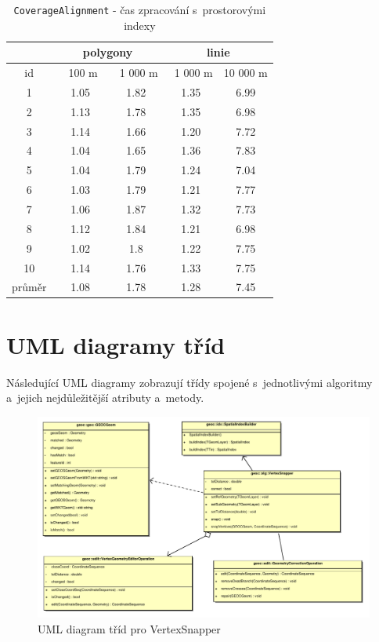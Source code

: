 \begin{table}[H]
 \centering
  \small
   \caption{\texttt{Coverage\-Alignment} - 
	    čas zpracování s~prostorovými indexy}
  \begin{tabular}{|c|c|c|c|c|}
   \hline
      & \multicolumn{2}{c|}{polygony} & 
 	\multicolumn{2}{c|}{linie} \\
   \hline
    id  &  ~~100 m~ & ~1 000 m & ~1 000 m & 10 000 m\\
   \hline
   \hline
1	&	1.05	&	1.82	&	1.35	&	6.99	\\
2	&	1.13	&	1.78	&	1.35	&	6.98	\\
3	&	1.14	&	1.66	&	1.20	&	7.72	\\
4	&	1.04	&	1.65	&	1.36	&	7.83	\\
5	&	1.04	&	1.79	&	1.24	&	7.04	\\
6	&	1.03	&	1.79	&	1.21	&	7.77	\\
7	&	1.06	&	1.87	&	1.32	&	7.73	\\
8	&	1.12	&	1.84	&	1.21	&	6.98	\\
9	&	1.02	&	1.8	&	1.22	&	7.75	\\
10	&	1.14	&	1.76	&	1.33	&	7.75	\\
   \hline
   \hline
   průměr & 1.08 & 1.78 & 1.28 & 7.45 \\
   \hline
  \end{tabular}
   \label{tab:ca-s}
\end{table}
 
\normalsize

\chapter{UML diagramy tříd}
\label{priloha-uml}

Následující UML diagramy zobrazují třídy spojené s~jednotlivými 
algoritmy a~jejich nejdůležitější atributy a~metody.

  \begin{figure}[ht]
    \centering
      \includegraphics[width=420pt]{./pictures/uml-vs.pdf}
      \caption{UML diagram tříd pro VertexSnapper}
      \label{fig:uml-vs}
  \end{figure}

